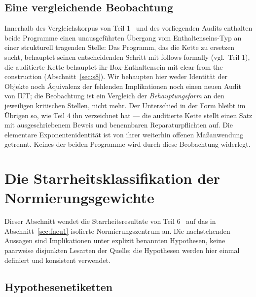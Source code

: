 \documentclass[11pt,a4paper]{article}
\theoremstyle{definition}
\theoremstyle{remark}
\begin{document}
\subsection{Eine vergleichende Beobachtung}\label{sec:symmetry}

Innerhalb des Vergleichskorpus von Teil 1~\cite{part1} und des vorliegenden
Audits enthalten beide Programme einen unausgeführten Übergang vom
Enthaltenseins-Typ an einer strukturell tragenden Stelle: Das Programm, das
die Kette zu ersetzen sucht, behauptet seinen entscheidenden Schritt mit
\glqq follows formally\grqq{} (vgl.\ Teil 1), die auditierte Kette behauptet ihr
Box-Enthaltensein mit \glqq clear from the construction\grqq{}
(Abschnitt~\ref{sec:s8}). Wir behaupten hier weder Identität der Objekte
noch Äquivalenz der fehlenden Implikationen noch einen neuen Audit von IUT;
die Beobachtung ist ein Vergleich der \emph{Behauptungsform} an den
jeweiligen kritischen Stellen, nicht mehr. Der Unterschied in der Form
bleibt im Übrigen so, wie Teil 4 ihn verzeichnet hat --- die auditierte
Kette stellt einen Satz mit ausgeschriebenem Beweis und benennbaren
Reparaturpflichten auf. Die elementare Exponentenidentität ist von ihrer
weiterhin offenen Maßanwendung getrennt.
Keines der beiden Programme wird durch diese Beobachtung widerlegt.

\section{Die Starrheitsklassifikation der Normierungsgewichte}\label{sec:case}

Dieser Abschnitt wendet die Starrheitsresultate von Teil 6~\cite{part6} auf
das in Abschnitt~\ref{sec:fneu1} isolierte Normierungszentrum an. Die
nachstehenden Aussagen sind Implikationen unter explizit benannten
Hypothesen, keine paarweise disjunkten Lesarten der Quelle; die Hypothesen
werden hier einmal definiert und konsistent verwendet.

\subsection{Hypothesenetiketten}\label{sec:hyplabels}
\end{document}
